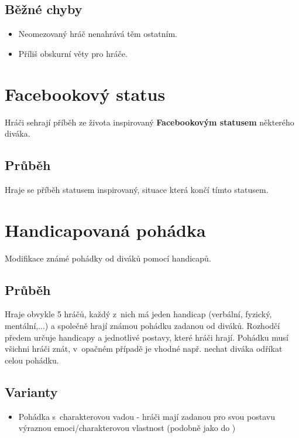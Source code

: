 \subsection{Běžné chyby} \begin{itemize}
\item  Neomezovaný hráč nenahrává těm ostatním.
\item  Příliš obskurní věty pro hráče.
\end{itemize}
 
 
 
\needspace{5cm} \section{Facebookový status} \label{facebookový status}  
 
Hráči sehrají příběh ze života inspirovaný  \textbf{Facebookovým statusem} některého diváka. 
 
\subsection{Průběh} Hraje se příběh statusem inspirovaný, situace která končí tímto statusem.  
 
 
 
\needspace{5cm} \section{Handicapovaná pohádka} \label{handicapovaná pohádka}  
 
 
Modifikace známé pohádky od diváků pomocí handicapů. 
 
\subsection{Průběh}  
Hraje obvykle 5 hráčů, každý z~nich má jeden handicap (verbální, fyzický, mentální,...) a společně hrají známou pohádku zadanou od diváků. Rozhodčí předem určuje handicapy a jednotlivé postavy, které hráči hrají. 
Pohádku musí všichni hráči znát, v~opačném případě je vhodné např. nechat diváka odříkat celou pohádku. 
 
\subsection{Varianty} \begin{itemize}
\item Pohádka s~charakterovou vadou - hráči mají zadanou pro svou postavu výraznou emoci/charakterovou vlastnost (podobně jako do )
\end{itemize}
 
